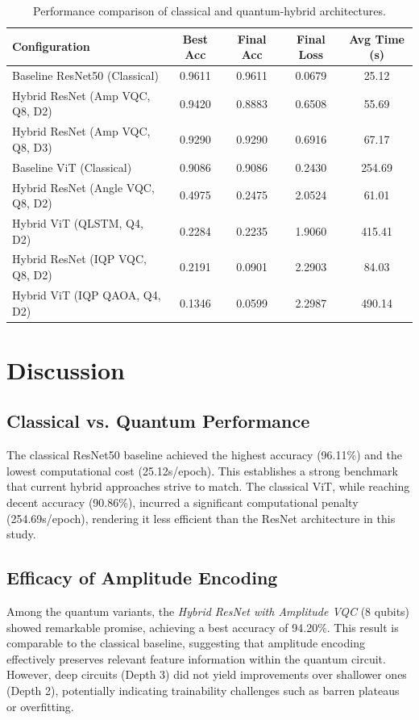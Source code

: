 \documentclass{article}
\begin{document}
\begin{table}[H]
    \centering
    \caption{Performance comparison of classical and quantum-hybrid architectures.}
    \label{tab:results}
    \begin{tabular}{lcccc}
        \toprule
        \textbf{Configuration} & \textbf{Best Acc} & \textbf{Final Acc} & \textbf{Final Loss} & \textbf{Avg Time (s)} \\
        \midrule
        Baseline ResNet50 (Classical) & 0.9611 & 0.9611 & 0.0679 & 25.12 \\
        Hybrid ResNet (Amp VQC, Q8, D2) & 0.9420 & 0.8883 & 0.6508 & 55.69 \\
        Hybrid ResNet (Amp VQC, Q8, D3) & 0.9290 & 0.9290 & 0.6916 & 67.17 \\
        Baseline ViT (Classical) & 0.9086 & 0.9086 & 0.2430 & 254.69 \\
        Hybrid ResNet (Angle VQC, Q8, D2) & 0.4975 & 0.2475 & 2.0524 & 61.01 \\
        Hybrid ViT (QLSTM, Q4, D2) & 0.2284 & 0.2235 & 1.9060 & 415.41 \\
        Hybrid ResNet (IQP VQC, Q8, D2) & 0.2191 & 0.0901 & 2.2903 & 84.03 \\
        Hybrid ViT (IQP QAOA, Q4, D2) & 0.1346 & 0.0599 & 2.2987 & 490.14 \\
        \bottomrule
    \end{tabular}
\end{table}

\section{Discussion}
\subsection{Classical vs. Quantum Performance}
The classical ResNet50 baseline achieved the highest accuracy (96.11\%) and the lowest computational cost (25.12s/epoch). This establishes a strong benchmark that current hybrid approaches strive to match. The classical ViT, while reaching decent accuracy (90.86\%), incurred a significant computational penalty (254.69s/epoch), rendering it less efficient than the ResNet architecture in this study.

\subsection{Efficacy of Amplitude Encoding}
Among the quantum variants, the \textit{Hybrid ResNet with Amplitude VQC} (8 qubits) showed remarkable promise, achieving a best accuracy of 94.20\%. This result is comparable to the classical baseline, suggesting that amplitude encoding effectively preserves relevant feature information within the quantum circuit. However, deep circuits (Depth 3) did not yield improvements over shallower ones (Depth 2), potentially indicating trainability challenges such as barren plateaus or overfitting.
\end{document}

